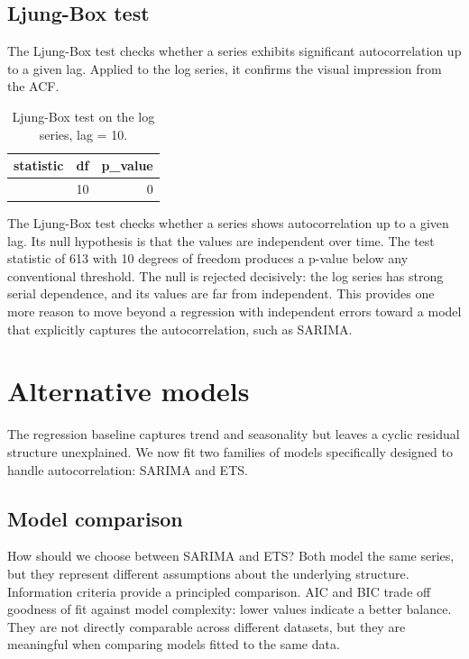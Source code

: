 \documentclass[
  english,
  a4paper,
]{article}
\begin{document}
\subsection{Ljung-Box test}\label{ljung-box-test}

The Ljung-Box test checks whether a series exhibits significant
autocorrelation up to a given lag. Applied to the log series, it
confirms the visual impression from the ACF.

{

\begin{longtable}[]{@{}rrr@{}}

\caption{\label{tbl-ljungbox}Ljung-Box test on the log series, lag =
10.}

\tabularnewline

\toprule\noalign{}
statistic & df & p\_value \\
\midrule\noalign{}
\endhead
\bottomrule\noalign{}
\endlastfoot
613.0387 & 10 & 0 \\

\end{longtable}

}

The Ljung-Box test checks whether a series shows autocorrelation up to a
given lag. Its null hypothesis is that the values are independent over
time. The test statistic of 613 with 10 degrees of freedom produces a
p-value below any conventional threshold. The null is rejected
decisively: the log series has strong serial dependence, and its values
are far from independent. This provides one more reason to move beyond a
regression with independent errors toward a model that explicitly
captures the autocorrelation, such as SARIMA.

\section{Alternative models}\label{alternative-models}

The regression baseline captures trend and seasonality but leaves a
cyclic residual structure unexplained. We now fit two families of models
specifically designed to handle autocorrelation: SARIMA and ETS.

\subsection{Model comparison}\label{model-comparison}

How should we choose between SARIMA and ETS? Both model the same series,
but they represent different assumptions about the underlying structure.
Information criteria provide a principled comparison. AIC and BIC trade
off goodness of fit against model complexity: lower values indicate a
better balance. They are not directly comparable across different
datasets, but they are meaningful when comparing models fitted to the
same data.
\end{document}
